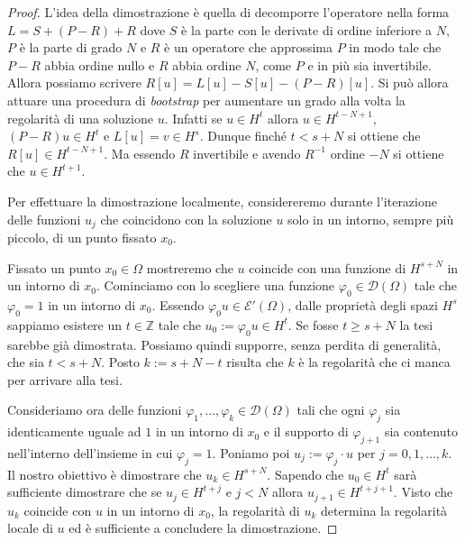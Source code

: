 \documentclass[italian,a4paper,oneside,headinclude]{scrbook}
\renewcommand{\phi}{\varphi}
\newcommand{\D}{\mathcal D}
\newcommand{\E}{\mathcal E}
\newcommand{\ZZ}{\mathbb Z}
\newcommand{\defeq}{:=}
\begin{document}
  \begin{proof}
    L'idea della dimostrazione è quella di decomporre l'operatore
    nella forma
    $L = S + (P-R) + R$ dove $S$ è la parte con le derivate di ordine
    inferiore a $N$, $P$ è la parte di grado $N$ e $R$ è un operatore
    che approssima $P$ in modo tale che $P-R$ abbia ordine nullo e $R$
    abbia ordine $N$, come $P$ e in più sia invertibile. Allora
    possiamo scrivere $R[u] = L[u] - S [u] - (P-R) [u]$. Si può allora
    attuare una procedura di \emph{bootstrap} per aumentare un grado
    alla volta la regolarità di una soluzione $u$.
    Infatti se $u \in H^t$ allora
    $u \in H^{t-N+1}$, $(P-R) u\in H^t$ e $L[u] = v\in H^s$.
    Dunque finché $t <  s+N$ si ottiene che $R [u]\in H^{t-N+1}$. Ma
    essendo $R$ invertibile e avendo $R^{-1}$ ordine $-N$ si ottiene
    che $u\in H^{t+1}$.

    Per effettuare la dimostrazione localmente, considereremo durante
    l'iterazione delle
    funzioni $u_j$ che coincidono con la soluzione $u$ solo in un
    intorno, sempre più piccolo, di un punto fissato $x_0$.




    Fissato un punto $x_0\in \Omega$ mostreremo che $u$ coincide con una
    funzione di $H^{s+N}$ in un intorno di $x_0$.
    Cominciamo con lo scegliere una funzione $\phi_0\in \D(\Omega)$
    tale che $\phi_0=1$ in un intorno di $x_0$.
    Essendo $\phi_0 u \in \E'(\Omega)$,
    dalle proprietà degli spazi $H^s$ sappiamo esistere un $t\in \ZZ$
    tale che $u_0\defeq \phi_0 u \in H^t$.
    Se fosse $t \ge s+N$ la tesi sarebbe già dimostrata. Possiamo
    quindi supporre, senza perdita di generalità, che sia $t< s+N$.
    Posto $k\defeq s+N-t$ risulta che $k$ è la regolarità che ci manca per
    arrivare alla tesi.

    Consideriamo ora delle funzioni
    $\phi_1, \dots, \phi_k \in  \D(\Omega)$
    tali che ogni $\phi_j$ sia identicamente uguale ad $1$ in un
    intorno di $x_0$ e il supporto di $\phi_{j+1}$ sia contenuto
    nell'interno dell'insieme in cui $\phi_j = 1$.
    Poniamo poi $u_j\defeq \phi_j \cdot u$ per $j=0,1, \dots, k$.
    Il nostro obiettivo è dimostrare che $u_k \in H^{s+N}$.
    Sapendo che $u_0 \in H^t$ sarà sufficiente dimostrare
    che se $u_j \in H^{t+j}$ e $j<N$ allora
    $u_{j+1} \in H^{t+j+1}$.
    Visto che $u_k$ coincide con $u$ in un intorno di $x_0$,
    la regolarità di $u_k$ determina la regolarità locale di $u$ ed
    è sufficiente a concludere la dimostrazione.


\end{proof}
\end{document}
